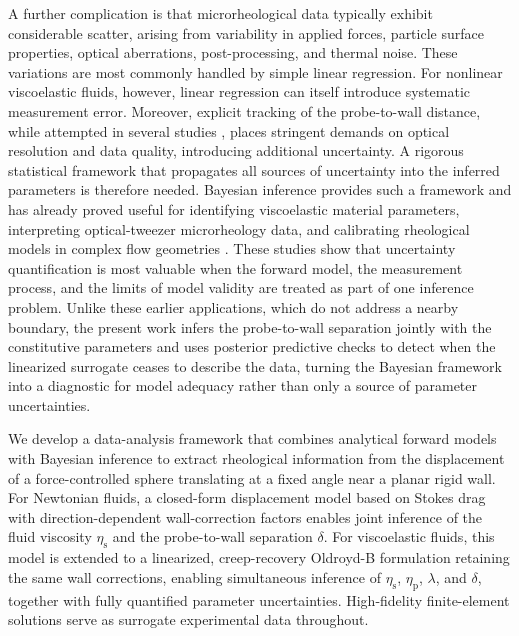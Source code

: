 \documentclass{elsarticle}
\begin{document}
A further complication is that microrheological data typically exhibit
considerable scatter, arising from variability in applied forces,
particle surface properties, optical aberrations, post-processing, and
thermal noise. These variations are most commonly handled by simple
linear regression. For nonlinear viscoelastic fluids, however, linear
regression can itself introduce systematic measurement error. Moreover,
explicit tracking of the probe-to-wall distance, while attempted in
several studies \cite{gong2013active}, places stringent demands on
optical resolution and data quality, introducing additional uncertainty.
A rigorous statistical framework that propagates all sources of
uncertainty into the inferred parameters is therefore needed.
Bayesian inference provides such a framework and has already proved
useful for identifying viscoelastic material parameters, interpreting
optical-tweezer microrheology data, and calibrating rheological models in
complex flow geometries
\cite{rappel2018viscoelastic,paul2021jeffreys,rinkens2023squeeze,
rinkens2026yield}. These studies show that uncertainty quantification is
most valuable when the forward model, the measurement process, and the
limits of model validity are treated as part of one inference problem.
Unlike these earlier applications, which do not address a nearby boundary,
the present work infers the probe-to-wall separation jointly with the
constitutive parameters and uses posterior predictive checks to detect
when the linearized surrogate ceases to describe the data, turning the
Bayesian framework into a diagnostic for model adequacy rather than only
a source of parameter uncertainties.

We develop a data-analysis framework that combines analytical forward
models with Bayesian inference to extract rheological information from
the displacement of a force-controlled sphere translating at a fixed
angle near a planar rigid wall. For Newtonian fluids, a closed-form
displacement model based on Stokes drag with direction-dependent
wall-correction factors enables joint inference of the fluid viscosity
$\eta_{\mathrm{s}}$ and the probe-to-wall separation $\delta$. For
viscoelastic fluids, this model is extended to a linearized,
creep-recovery Oldroyd-B formulation retaining the same wall
corrections, enabling simultaneous inference of $\eta_{\mathrm{s}}$,
$\eta_{\mathrm{p}}$, $\lambda$, and $\delta$, together with fully
quantified parameter uncertainties. High-fidelity finite-element
solutions serve as surrogate experimental data throughout.
\end{document}
